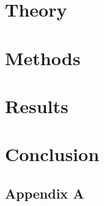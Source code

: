 \documentclass[10pt, twoside, letterpaper]{report}
\begin{document}
\chapter{Theory}
\label{ch:theory}


\chapter{Methods}
\label{ch:methods}


\chapter{Results}
\label{ch:results}


\chapter{Conclusion}
\label{ch:conclusion}




\begin{appendices}

\chapter{Appendix A}
\label{app:appendix_a}


\end{appendices}
\end{document}
